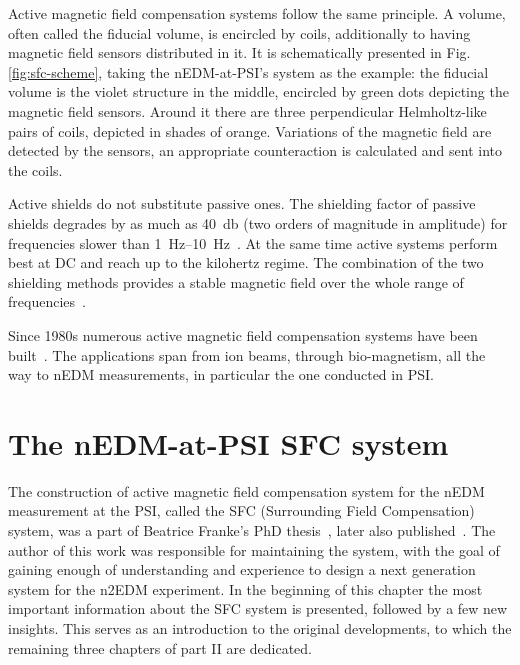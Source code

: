 Active magnetic field compensation systems follow the same principle. A volume, often called the fiducial volume, is encircled by coils, additionally to having magnetic field sensors distributed in it. It is schematically presented in Fig.\,\ref{fig:sfc-scheme}, taking the nEDM-at-PSI's system as the example: the fiducial volume is the violet structure in the middle, encircled by green dots depicting the magnetic field sensors. Around it there are three perpendicular Helmholtz-like pairs of coils, depicted in shades of orange. Variations of the magnetic field are detected by the sensors, an appropriate counteraction is calculated and sent into the coils.

Active shields do not substitute passive ones. The shielding factor
 of passive shields degrades by as much as \SI{40}{\decibel} (two orders of magnitude in amplitude) for frequencies slower than \SIrange[range-phrase = --]{1}{10}{\hertz}~\cite{Brake1991}. At the same time active systems perform best at DC and reach up to the kilohertz regime. The combination of the two shielding methods provides a stable magnetic field over the whole range of frequencies~\cite{Brake1991,Kelha1982,Voigt2013}.

Since 1980s numerous active magnetic field compensation systems have been built~\cite{Kelha1982,Brake1991,Spemann2003,Brys2005,Kobayashi2012,Voigt2013,Afach2014}. The applications span from ion beams, through bio-magnetism, all the way to nEDM measurements, in particular the one conducted in PSI\@.




\section{The nEDM-at-PSI SFC system}
The construction of active magnetic field compensation system for the nEDM measurement at the PSI, called the SFC (Surrounding Field Compensation) system,
was a part of Beatrice Franke's PhD thesis~\cite{Franke2013}, later also published~\cite{Afach2014}. The author of this work was responsible for maintaining the system, with the goal of gaining enough of understanding and experience to design a next generation system for the n2EDM experiment. In the beginning of this chapter the most important information about the SFC system is presented, followed by a few new insights. This serves as an introduction to the original developments, to which the remaining three chapters of part II are dedicated.

